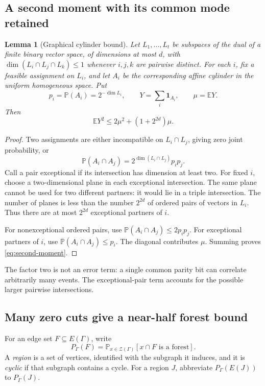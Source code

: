 \documentclass[11pt,a4paper]{article}
\numberwithin{equation}{section}
\newtheorem{lemma}[theorem]{Lemma}
\theoremstyle{definition}
\theoremstyle{remark}
\newcommand{\cZ}{\mathcal Z}
\newcommand{\E}{\mathbb E}
\newcommand{\Prob}{\mathbb P}
\newcommand{\ind}{\mathbf 1}
\begin{document}
\subsection{A second moment with its common mode retained}
\begin{lemma}[Graphical cylinder bound]\label{lem:cylinders}
Let $L_1,\ldots,L_t$ be subspaces of the dual of a finite binary vector space, of dimensions at most $d$, with $\dim(L_i\cap L_j\cap L_k)\le1$ whenever $i,j,k$ are pairwise distinct. For each $i$, fix a feasible assignment on $L_i$, and let $A_i$ be the corresponding affine cylinder in the uniform homogeneous space. Put
\[
 p_i=\Prob(A_i)=2^{-\dim L_i},\qquad Y=\sum_i\ind_{A_i},\qquad \mu=\E Y.
\]
Then
\begin{equation}\label{eq:second-moment}
 \E Y^2\le2\mu^2+(1+2^{2d})\mu.
\end{equation}
\end{lemma}
\begin{proof}
Two assignments are either incompatible on $L_i\cap L_j$, giving zero joint probability, or
\[
 \Prob(A_i\cap A_j)=2^{\dim(L_i\cap L_j)}p_ip_j.
\]
Call a pair exceptional if its intersection has dimension at least two. For fixed $i$, choose a two-dimensional plane in each exceptional intersection. The same plane cannot be used for two different partners: it would lie in a triple intersection. The number of planes is less than the number $2^{2d}$ of ordered pairs of vectors in $L_i$. Thus there are at most $2^{2d}$ exceptional partners of $i$.

For nonexceptional ordered pairs, use $\Prob(A_i\cap A_j)\le2p_ip_j$. For exceptional partners of $i$, use $\Prob(A_i\cap A_j)\le p_i$. The diagonal contributes $\mu$. Summing proves \eqref{eq:second-moment}.
\end{proof}

The factor two is not an error term: a single common parity bit can correlate arbitrarily many events. The exceptional-pair term accounts for the possible larger pairwise intersections.

\subsection{Many zero cuts give a near-half forest bound}
For an edge set $F\subseteq E(\Gamma)$, write
\[
 P_\Gamma(F)=\Prob_{x\in\cZ(\Gamma)}[x\cap F\text{ is a forest}].
\]
A \emph{region} is a set of vertices, identified with the subgraph it induces, and it is \emph{cyclic} if that subgraph contains a cycle. For a region $J$, abbreviate $P_\Gamma(E(J))$ to $P_\Gamma(J)$.
\end{document}
